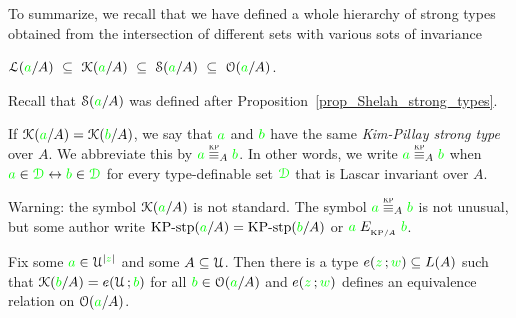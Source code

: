 \documentclass[creche.tex]{subfiles}
\begin{document}
To summarize, we recall that we have defined a whole hierarchy of strong types obtained from the intersection of different sets with various sots of invariance

\hfil$\Ll({\gr a}/A)\ \subseteq\ \K({\gr a}/A)\ \subseteq\ \S({\gr a}/A)\ \subseteq\ \O({\gr a}/A)$. 

Recall that $\EuScript S({\color{green} a}/A)$ was defined after Proposition~\ref{prop_Shelah_strong_types}.



If $\EuScript K({\color{green} a}/A)=\EuScript K({\color{green} b}/A)$, we say that ${\color{green} a}$ and ${\color{green} b}$ have the same  \emph{Kim-Pillay strong type\/} over $A$. We abbreviate this by \emph{${\gr a}\stackrel{\smash{\scalebox{.5}{\rm KP}}}{\equiv}_A{\gr b}$}. In other words, we write ${\gr a}\equivKP_A{\gr b}$ when ${\color{green} a}\in{\color{green}\EuScript D}\leftrightarrow{\color{green}b}\in{\color{green}\EuScript D}$ for every type-definable set ${\color{green}\EuScript D}$ that is Lascar invariant over $A$.


\noindent\llap{\textcolor{red}{\Large\danger}\kern1.5ex}Warning: the symbol $\EuScript K({\color{green} a}/A)$ is not standard. The symbol ${\gr a}\equivKP_A{\gr b}$ is not unusual, but some author write ${\rm KP{\mbox{-}}stp}({\color{green} a}/A)={\rm KP{\mbox{-}}stp}({\color{green} b}/A)$ or ${\color{green} a}\mathrel{E_{_{{\rm KP}/A}}}{\color{green} b}$.

\begin{proposition}\label{prop_bardotto}
  Fix some ${\color{green} a}\in\EuScript U^{|{\color{green} z}|}$ and some $A\subseteq\EuScript U$. Then there is a type $e({\color{green} z}\,;{\color{green} w})\subseteq L(A)$ such that $\EuScript K({\color{green} b}/A)=e(\EuScript U\,;{\color{green} b})$ for all ${\color{green} b}\in\EuScript O({\color{green} a}/A)$ and $e({\color{green} z}\,;{\color{green} w})$ defines an equivalence relation on $\EuScript O({\color{green} a}/A)$.
\end{proposition}
\end{document}
